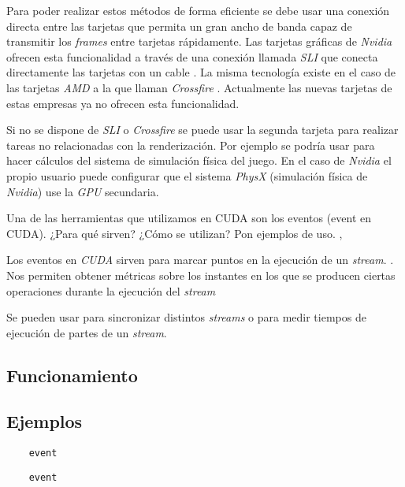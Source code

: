 \begin{pregunta}
Para poder realizar estos métodos de forma eficiente se debe usar
una conexión directa entre las tarjetas que permita un gran ancho de banda capaz
de transmitir los \emph{frames} entre tarjetas rápidamente. Las tarjetas
gráficas de \emph{Nvidia} ofrecen esta funcionalidad a través de una conexión
llamada \emph{SLI} que conecta directamente las tarjetas con un cable
\cite{noauthor_sli_nodate}. La misma
tecnología existe en el caso de las tarjetas \emph{AMD} a la que llaman
\emph{Crossfire} \cite{noauthor_amd_nodate}. Actualmente las nuevas tarjetas de
estas empresas ya no ofrecen esta funcionalidad.

Si no se dispone de \emph{SLI} o \emph{Crossfire} se puede usar la segunda
tarjeta para realizar tareas no relacionadas con la renderizaci\'on. Por ejemplo
se podría usar para hacer cálculos del sistema de simulación física del juego.
En el caso de \emph{Nvidia} el propio usuario puede configurar que el sistema
\emph{PhysX} (simulación física de \emph{Nvidia}) use la \emph{GPU} secundaria.



\end{pregunta}
\begin{pregunta}{Una de las herramientas que utilizamos en CUDA son los eventos (event en
CUDA). ¿Para qué sirven? ¿Cómo se utilizan? Pon ejemplos de uso.} \sep{}

Los eventos en \emph{CUDA} sirven para marcar puntos en la ejecución de un \emph{stream}.
\cite{noauthor_event_nodate}. Nos permiten obtener métricas sobre los instantes en los
que se producen ciertas operaciones durante la ejecución del \emph{stream}

Se pueden usar para sincronizar distintos \emph{streams} o para medir tiempos de ejecución
de partes de un \emph{stream}.

\subsection*{Funcionamiento}

\subsection*{Ejemplos}

\begin{listing}[H]
    \caption{Medir el tiempo de ejecución de un kernel con \emph{events}}
    \label{lst:kernel-event}
    \begin{verbatim}
    event
    \end{verbatim}
\end{listing}

\begin{listing}[H]
    \caption{Sincronización de \emph{streams} con \emph{events}}
    \label{lst:kernel-event-streams}
    \begin{verbatim}
    event
    \end{verbatim}
\end{listing}

\end{pregunta}
